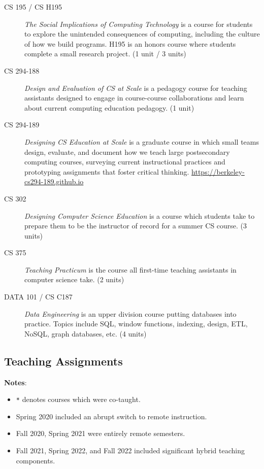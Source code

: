 \begin{description}
    \item[CS 195 / CS H195] \textit{The Social Implications of Computing Technology} is a course for students to explore the unintended consequences of computing, including the culture of how we build programs. H195 is an honors course where students complete a small research project. (1 unit / 3 units)
    
    \item[CS 294-188] \textit{Design and Evaluation of CS at Scale} is a pedagogy course for teaching assistants designed to engage in course-course collaborations and learn about current computing education pedagogy.  (1 unit)

    \item[CS 294-189] \textit{Designing CS Education at Scale} is a graduate course in which small teams design, evaluate, and document how we teach large postsecondary computing courses, surveying current instructional practices and prototyping assignments that foster critical thinking.
    \newline
    \small{\href{https://berkeley-cs294-189.github.io}{https://berkeley-cs294-189.github.io}}
    
    \item[CS 302] \textit{Designing Computer Science Education} is a course which students take to prepare them to be the instructor of record for a summer CS course. (3 units)
    
    \item[CS 375] \textit{Teaching Practicum} is the course all first-time teaching assistants in computer science take. (2 units)

    \item[DATA 101 / CS C187] \textit{Data Engineering} is an upper division course putting databases into practice. Topics include SQL, window functions, indexing, design, ETL, NoSQL, graph databases, etc. (4 units)
\end{description}

\vspace{5pt}

\subsection{Teaching Assignments}

\textbf{Notes}:
\begin{itemize}
    \item \texttt{*} denotes courses which were co-taught.
    \item Spring 2020 included an abrupt switch to remote instruction.
    \item Fall 2020, Spring 2021 were entirely remote semesters.
    \item Fall 2021, Spring 2022, and Fall 2022 included significant hybrid teaching components.
\end{itemize}

